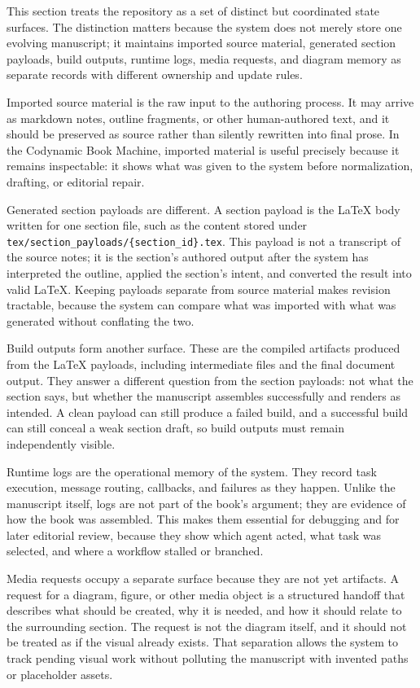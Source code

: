 This section treats the repository as a set of distinct but coordinated state surfaces. The distinction matters because the system does not merely store one evolving manuscript; it maintains imported source material, generated section payloads, build outputs, runtime logs, media requests, and diagram memory as separate records with different ownership and update rules.

Imported source material is the raw input to the authoring process. It may arrive as markdown notes, outline fragments, or other human-authored text, and it should be preserved as source rather than silently rewritten into final prose. In the Codynamic Book Machine, imported material is useful precisely because it remains inspectable: it shows what was given to the system before normalization, drafting, or editorial repair.

Generated section payloads are different. A section payload is the \LaTeX{} body written for one section file, such as the content stored under \texttt{tex/section\_payloads/\{section\_id\}.tex}. This payload is not a transcript of the source notes; it is the section's authored output after the system has interpreted the outline, applied the section's intent, and converted the result into valid \LaTeX{}. Keeping payloads separate from source material makes revision tractable, because the system can compare what was imported with what was generated without conflating the two.

Build outputs form another surface. These are the compiled artifacts produced from the \LaTeX{} payloads, including intermediate files and the final document output. They answer a different question from the section payloads: not what the section says, but whether the manuscript assembles successfully and renders as intended. A clean payload can still produce a failed build, and a successful build can still conceal a weak section draft, so build outputs must remain independently visible.

Runtime logs are the operational memory of the system. They record task execution, message routing, callbacks, and failures as they happen. Unlike the manuscript itself, logs are not part of the book's argument; they are evidence of how the book was assembled. This makes them essential for debugging and for later editorial review, because they show which agent acted, what task was selected, and where a workflow stalled or branched.

Media requests occupy a separate surface because they are not yet artifacts. A request for a diagram, figure, or other media object is a structured handoff that describes what should be created, why it is needed, and how it should relate to the surrounding section. The request is not the diagram itself, and it should not be treated as if the visual already exists. That separation allows the system to track pending visual work without polluting the manuscript with invented paths or placeholder assets.

